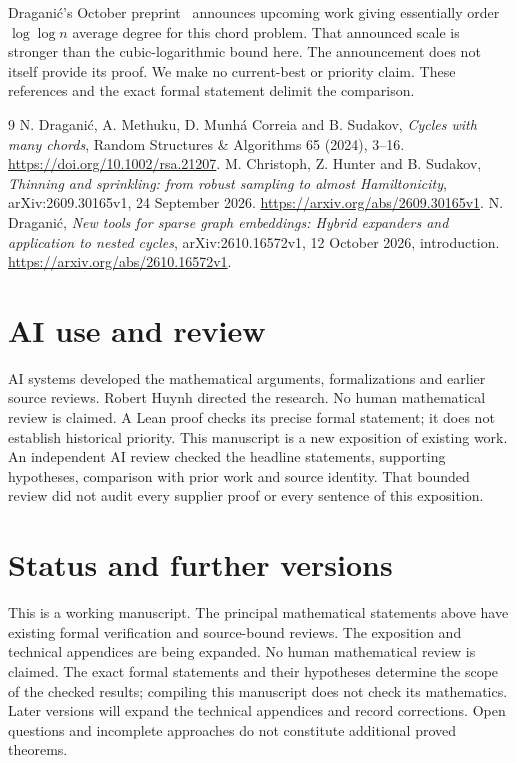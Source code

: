 \documentclass[11pt]{article}
\begin{document}
Dragani\'c's October preprint~\cite{announcement} announces upcoming work giving essentially order $\log\log n$ average degree for this chord problem. That announced scale is stronger than the cubic-logarithmic bound here. The announcement does not itself provide its proof. We make no current-best or priority claim. These references and the exact formal statement delimit the comparison.

\begin{thebibliography}{9}
 N. Dragani\'c, A. Methuku, D. Munh\'a Correia and B. Sudakov, \emph{Cycles with many chords}, Random Structures \& Algorithms 65 (2024), 3--16. \url{https://doi.org/10.1002/rsa.21207}.
 M. Christoph, Z. Hunter and B. Sudakov, \emph{Thinning and sprinkling: from robust sampling to almost Hamiltonicity}, arXiv:2609.30165v1, 24 September 2026. \url{https://arxiv.org/abs/2609.30165v1}.
 N. Dragani\'c, \emph{New tools for sparse graph embeddings: Hybrid expanders and application to nested cycles}, arXiv:2610.16572v1, 12 October 2026, introduction. \url{https://arxiv.org/abs/2610.16572v1}.
\end{thebibliography}

\section{AI use and review}
AI systems developed the mathematical arguments, formalizations and earlier source reviews. Robert Huynh directed the research. No human mathematical review is claimed. A Lean proof checks its precise formal statement; it does not establish historical priority. This manuscript is a new exposition of existing work. An independent AI review checked the headline statements, supporting hypotheses, comparison with prior work and source identity. That bounded review did not audit every supplier proof or every sentence of this exposition.
\section{Status and further versions}
This is a working manuscript. The principal mathematical statements above have existing formal verification and source-bound reviews. The exposition and technical appendices are being expanded. No human mathematical review is claimed. The exact formal statements and their hypotheses determine the scope of the checked results; compiling this manuscript does not check its mathematics.
Later versions will expand the technical appendices and record corrections. Open questions and incomplete approaches do not constitute additional proved theorems.
\end{document}
